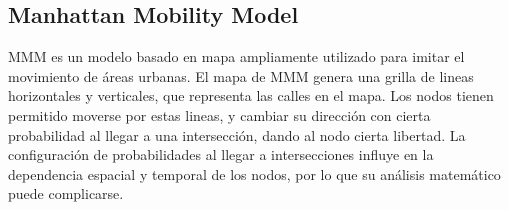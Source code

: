 \subsection{Manhattan Mobility Model}

MMM es un modelo basado en mapa ampliamente utilizado para imitar el movimiento de áreas urbanas. El mapa de MMM genera una grilla de lineas horizontales y verticales, que representa las calles en el mapa. Los nodos tienen permitido moverse por estas lineas, y cambiar su dirección con cierta probabilidad al llegar a una intersección, dando al nodo cierta libertad. La configuración de probabilidades al llegar a intersecciones influye en la dependencia espacial y temporal de los nodos, por lo que su análisis matemático puede complicarse.
